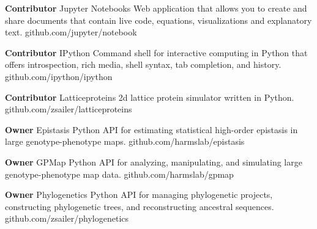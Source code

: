 \begin{cvossoftware}

  \cvoss
    {\textbf{Contributor} Jupyter Notebooks} %
    {Web application that allows you to create and share documents that contain live code, equations, visualizations and explanatory text.} %
    {github.com/jupyter/notebook}%

  \cvoss
    {\textbf{Contributor} IPython} %
    {Command shell for interactive computing in Python that offers introspection, rich media, shell syntax, tab completion, and history.}
    {github.com/ipython/ipython} %

  \cvoss
    {\textbf{Contributor} Latticeproteins} %
    {2d lattice protein simulator written in Python.}
    {github.com/zsailer/latticeproteins} %

  \cvoss
    {\textbf{Owner} Epistasis} %
    {Python API for estimating statistical high-order epistasis in large genotype-phenotype maps.}
    {github.com/harmslab/epistasis} %

  \cvoss
    {\textbf{Owner} GPMap} %
    {Python API for analyzing, manipulating, and simulating large genotype-phenotype map data.}
    {github.com/harmslab/gpmap} %

  \cvoss
    {\textbf{Owner} Phylogenetics} %
    {Python API for managing phylogenetic projects, constructing phylogenetic trees, and reconstructing ancestral sequences.}
    {github.com/zsailer/phylogenetics} %

\end{cvossoftware}
